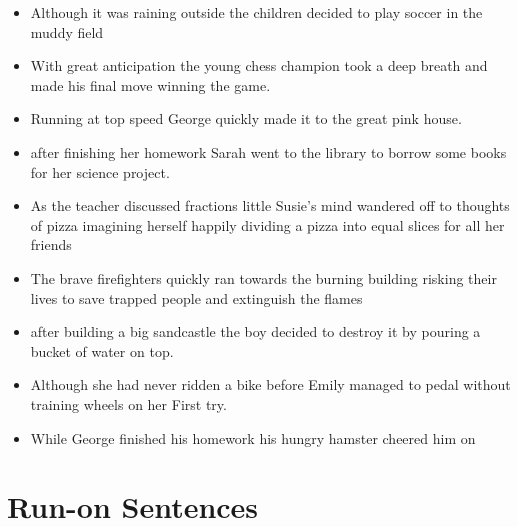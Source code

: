 \documentclass[letterpaper, 17pt]{article}
\begin{document}
\begin{itemize}
	\item Although it was raining outside the children decided to play soccer in the muddy field	%

	\item With great anticipation the young chess champion took a deep breath and made his final move winning the game.	%

	\item Running at top speed George quickly made it to the great pink house.	%

	\item after finishing her homework Sarah went to the library to borrow some books for her science project.	%

	\item As the teacher discussed fractions little Susie's mind wandered off to thoughts of pizza imagining herself happily dividing a pizza into equal slices for all her friends	%

	\item The brave firefighters quickly ran towards the burning building risking their lives to save trapped people and extinguish the flames		%

	\item after building a big sandcastle the boy decided to destroy it by pouring a bucket of water on top.	%

	\item Although she had never ridden a bike before Emily managed to pedal without training wheels on her First try.	%

	\item While George finished his homework his hungry hamster cheered him on	%
\end{itemize}

\newpage
\section*{Run-on Sentences}
\end{document}
